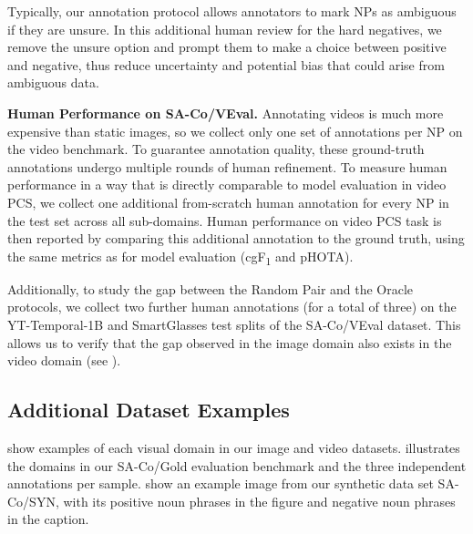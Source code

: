 \documentclass[]{fairmeta}
\newcommand{\task}{PCS\xspace}
\newcommand{\dsname}{{SA-Co}\xspace}
\newcommand{\trainsyn}{{\dsname/SYN}\xspace}
\newcommand{\evalgold}{{\dsname/Gold}\xspace}
\newcommand{\evalvid}{{\dsname/VEval}\xspace}
\newcommand{\cgf}{cgF\textsubscript{1}\xspace}
\renewcommand{\paragraph}[1]{%
	\noindent\textbf{#1.}\noindent\xspace%
}
\begin{document}
Typically, our annotation protocol allows annotators to mark NPs as ambiguous if they are unsure. In this additional human review for the hard negatives, we remove the unsure option and prompt them to make a choice between positive and negative, thus reduce uncertainty and potential bias that could arise from ambiguous data.



\paragraph{Human Performance on \evalvid} Annotating videos is much more expensive than static images, so we collect only one set of annotations per NP on the video benchmark. To guarantee annotation quality, these ground-truth annotations undergo multiple rounds of human refinement. To measure human performance in a way that is directly comparable to model evaluation in video \task, we collect one additional from-scratch human annotation for every NP in the test set across all sub-domains. Human performance on video \task task is then reported by comparing this additional annotation to the ground truth, using the same metrics as for model evaluation (\cgf and pHOTA).

Additionally, to study the gap between the Random Pair and the Oracle protocols, we collect two further human annotations (for a total of three) on the YT-Temporal-1B and SmartGlasses test splits of the \evalvid dataset. This allows us to verify that the gap observed in the image domain also exists in the video domain (see ).


\subsection{Additional Dataset Examples}

 show examples of each visual domain in our image and video datasets.  illustrates the domains in our \evalgold evaluation benchmark and the three independent annotations per sample.  show an example image from our synthetic data set \trainsyn, with its positive noun phrases in the figure and negative noun phrases in the caption.

\newlength{\oldtabcolseptwo}
\setlength{\oldtabcolseptwo}{\tabcolsep}
\end{document}

